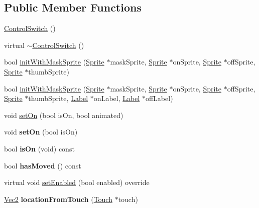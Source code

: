 \subsection*{Public Member Functions}
\begin{DoxyCompactItemize}
\item 
\hyperlink{classControlSwitch_a8efa38cf6b25871b6c1417f5965c656b}{Control\+Switch} ()
\item 
virtual \hyperlink{classControlSwitch_a4003ce5f832d62398b3d251c0c037421}{$\sim$\+Control\+Switch} ()
\item 
bool \hyperlink{classControlSwitch_a3b67353d399371a96cd4231ba274ff0e}{init\+With\+Mask\+Sprite} (\hyperlink{classSprite}{Sprite} $\ast$mask\+Sprite, \hyperlink{classSprite}{Sprite} $\ast$on\+Sprite, \hyperlink{classSprite}{Sprite} $\ast$off\+Sprite, \hyperlink{classSprite}{Sprite} $\ast$thumb\+Sprite)
\item 
bool \hyperlink{classControlSwitch_adea9bc3322f3cc28ea660cb5d4b02b65}{init\+With\+Mask\+Sprite} (\hyperlink{classSprite}{Sprite} $\ast$mask\+Sprite, \hyperlink{classSprite}{Sprite} $\ast$on\+Sprite, \hyperlink{classSprite}{Sprite} $\ast$off\+Sprite, \hyperlink{classSprite}{Sprite} $\ast$thumb\+Sprite, \hyperlink{classLabel}{Label} $\ast$on\+Label, \hyperlink{classLabel}{Label} $\ast$off\+Label)
\item 
void \hyperlink{classControlSwitch_a3e696f55493149e7c6aebf4134304071}{set\+On} (bool is\+On, bool animated)
\item 
\mbox{\label{classControlSwitch_ac2bf0d1be9a00fcb4b5b9281849a6cd5}} 
void {\bfseries set\+On} (bool is\+On)
\item 
\mbox{\label{classControlSwitch_ad4af475419ce4aa3e0596aac747d0939}} 
bool {\bfseries is\+On} (void) const
\item 
\mbox{\label{classControlSwitch_a7bd98521bbf0a04f1a8430a16909f2c6}} 
bool {\bfseries has\+Moved} () const
\item 
virtual void \hyperlink{classControlSwitch_a6e27f98a50b25ba395f2ad7a5c1aa59f}{set\+Enabled} (bool enabled) override
\item 
\mbox{\label{classControlSwitch_aa8cbcfac92dc02724eb12811395f3a2f}} 
\hyperlink{classVec2}{Vec2} {\bfseries location\+From\+Touch} (\hyperlink{classTouch}{Touch} $\ast$touch)

\end{DoxyCompactItemize}
